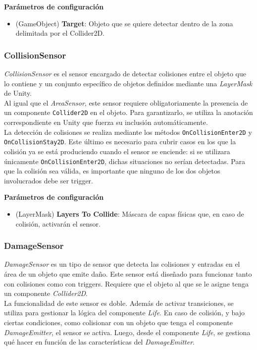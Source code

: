 \textbf{Parámetros de configuración}
\begin{itemize}
	\item (GameObject) \textbf{Target}: Objeto que se quiere detectar dentro de la zona delimitada por el Collider2D.
\end{itemize}

\subsubsection{CollisionSensor}
\textit{CollisionSensor} es el sensor encargado de detectar colisiones entre el objeto que lo contiene y un conjunto específico de objetos definidos mediante una \textit{LayerMask} de Unity.\\

Al igual que el \textit{AreaSensor}, este sensor requiere obligatoriamente la presencia de un componente \texttt{Collider2D} en el objeto. Para garantizarlo, se utiliza la anotación correspondiente en Unity que fuerza su inclusión automáticamente.\\

La detección de colisiones se realiza mediante los métodos \texttt{OnCollisionEnter2D} y \texttt{OnCollisionStay2D}. Este último es necesario para cubrir casos en los que la colisión ya se está produciendo cuando el sensor se enciende: si se utilizara únicamente \texttt{OnCollisionEnter2D}, dichas situaciones no serían detectadas. Para que la colisión sea válida, es importante que ninguno de los dos objetos involucrados debe ser trigger.


\textbf{Parámetros de configuración}
\begin{itemize}
	\item (LayerMask) \textbf{Layers To Collide}: Máscara de capas físicas que, en caso de colisión, activarán el sensor.
\end{itemize}

\subsubsection{DamageSensor}

\textit{DamageSensor} es un tipo de sensor que detecta las colisiones y entradas en el área de un objeto que emite daño. Este sensor está diseñado para funcionar tanto con colisiones como con triggers. Requiere que el objeto al que se le asigne tenga un componente \textit{Collider2D}.\\

La funcionalidad de este sensor es doble. Además de activar transiciones, se utiliza para gestionar la lógica del componente \textit{Life}. En caso de colisión, y bajo ciertas condiciones, como colisionar con un objeto que tenga el componente \textit{DamageEmitter}, el sensor se activa. Luego, desde el componente \textit{Life}, se gestiona qué hacer en función de las características del \textit{DamageEmitter}.\\

